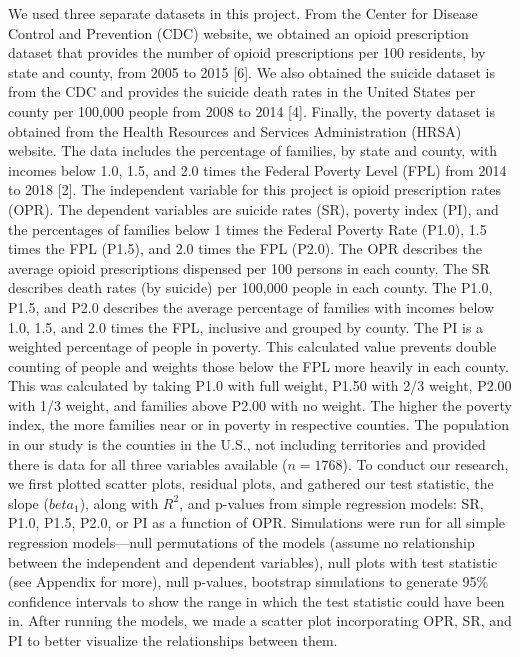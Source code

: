 \documentclass[
]{article}
\begin{document}
We used three separate datasets in this project. From the Center for
Disease Control and Prevention (CDC) website, we obtained an opioid
prescription dataset that provides the number of opioid prescriptions
per 100 residents, by state and county, from 2005 to 2015 {[}6{]}. We
also obtained the suicide dataset is from the CDC and provides the
suicide death rates in the United States per county per 100,000 people
from 2008 to 2014 {[}4{]}. Finally, the poverty dataset is obtained from
the Health Resources and Services Administration (HRSA) website. The
data includes the percentage of families, by state and county, with
incomes below 1.0, 1.5, and 2.0 times the Federal Poverty Level (FPL)
from 2014 to 2018 {[}2{]}. The independent variable for this project is
opioid prescription rates (OPR). The dependent variables are suicide
rates (SR), poverty index (PI), and the percentages of families below 1
times the Federal Poverty Rate (P1.0), 1.5 times the FPL (P1.5), and 2.0
times the FPL (P2.0). The OPR describes the average opioid prescriptions
dispensed per 100 persons in each county. The SR describes death rates
(by suicide) per 100,000 people in each county. The P1.0, P1.5, and P2.0
describes the average percentage of families with incomes below 1.0,
1.5, and 2.0 times the FPL, inclusive and grouped by county. The PI is a
weighted percentage of people in poverty. This calculated value prevents
double counting of people and weights those below the FPL more heavily
in each county. This was calculated by taking P1.0 with full weight,
P1.50 with 2/3 weight, P2.00 with 1/3 weight, and families above P2.00
with no weight. The higher the poverty index, the more families near or
in poverty in respective counties. The population in our study is the
counties in the U.S., not including territories and provided there is
data for all three variables available (\(n = 1768\)). To conduct our
research, we first plotted scatter plots, residual plots, and gathered
our test statistic, the slope (\(beta_1\)), along with \(R^2\), and
p-values from simple regression models: SR, P1.0, P1.5, P2.0, or PI as a
function of OPR. Simulations were run for all simple regression
models---null permutations of the models (assume no relationship between
the independent and dependent variables), null plots with test statistic
(see Appendix for more), null p-values, bootstrap simulations to
generate 95\% confidence intervals to show the range in which the test
statistic could have been in. After running the models, we made a
scatter plot incorporating OPR, SR, and PI to better visualize the
relationships between them.
\end{document}
